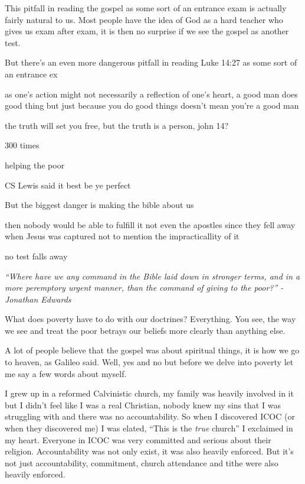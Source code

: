 \documentclass[aps,preprint,preprintnumbers,nofootinbib,showpacs,prd]{revtex4-1}
\begin{document}
This pitfall in reading the gospel as some sort of an entrance exam is actually fairly natural to us. Most people have the idea of God as a hard teacher who gives us exam after exam, it is then no surprise if we see the gospel as another test.

But there's an even more dangerous pitfall in reading Luke 14:27 as some sort of an entrance ex

as one's action might not necessarily a reflection of one's heart, a good man does good thing but just because you do good things doesn't mean you're a good man

the truth will set you free, but the truth is a person, john 14?


300 times

helping the poor


CS Lewis said it best be ye perfect




But the biggest danger is making the bible about us



then nobody would be able to fulfill it not even the apostles since they fell away when Jesus was captured not to mention the impracticallity of it


no test
falls away


{\it ``Where have we any command in the Bible laid down in stronger terms, and in a more peremptory urgent manner, than the command of giving to the poor?'' - Jonathan Edwards}

\bigskip
\bigskip

What does poverty have to do with our doctrines? Everything. You see, the way we see and treat the poor betrays our beliefs more clearly than anything else.

A lot of people believe that the gospel was about spiritual things, it is how we go to heaven, as Galileo said. Well, yes and no but before we delve into poverty let me say a few words about myself.

I grew up in a reformed Calvinistic church, my family was heavily involved in it but I didn't feel like I was a real Christian, nobody knew my sins that I was struggling with and there was no accountability. So when I discovered ICOC (or when they discovered me) I was elated, ``This is the {\it true} church'' I exclaimed in my heart. Everyone in ICOC was very committed and serious about their religion. Accountability was not only exist, it was also heavily enforced. But it's not just accountability, commitment, church attendance and tithe were also heavily enforced.
\end{document}
